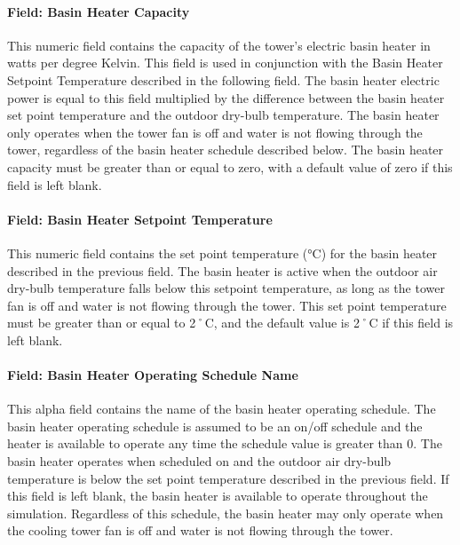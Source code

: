 \paragraph{Field: Basin Heater Capacity}\label{field-basin-heater-capacity}

This numeric field contains the capacity of the tower's electric basin heater in watts per degree Kelvin. This field is used in conjunction with the Basin Heater Setpoint Temperature described in the following field. The basin heater electric power is equal to this field multiplied by the difference between the basin heater set point temperature and the outdoor dry-bulb temperature. The basin heater only operates when the tower fan is off and water is not flowing through the tower, regardless of the basin heater schedule described below. The basin heater capacity must be greater than or equal to zero, with a default value of zero if this field is left blank.

\paragraph{Field: Basin Heater Setpoint Temperature}\label{field-basin-heater-setpoint-temperature}

This numeric field contains the set point temperature (°C) for the basin heater described in the previous field. The basin heater is active when the outdoor air dry-bulb temperature falls below this setpoint temperature, as long as the tower fan is off and water is not flowing through the tower. This set point temperature must be greater than or equal to 2˚C, and the default value is 2˚C if this field is left blank.

\paragraph{Field: Basin Heater Operating Schedule Name}\label{field-basin-heater-operating-schedule-name}

This alpha field contains the name of the basin heater operating schedule. The basin heater operating schedule is assumed to be an on/off schedule and the heater is available to operate any time the schedule value is greater than 0. The basin heater operates when scheduled on and the outdoor air dry-bulb temperature is below the set point temperature described in the previous field. If this field is left blank, the basin heater is available to operate throughout the simulation. Regardless of this schedule, the basin heater may only operate when the cooling tower fan is off and water is not flowing through the tower.

